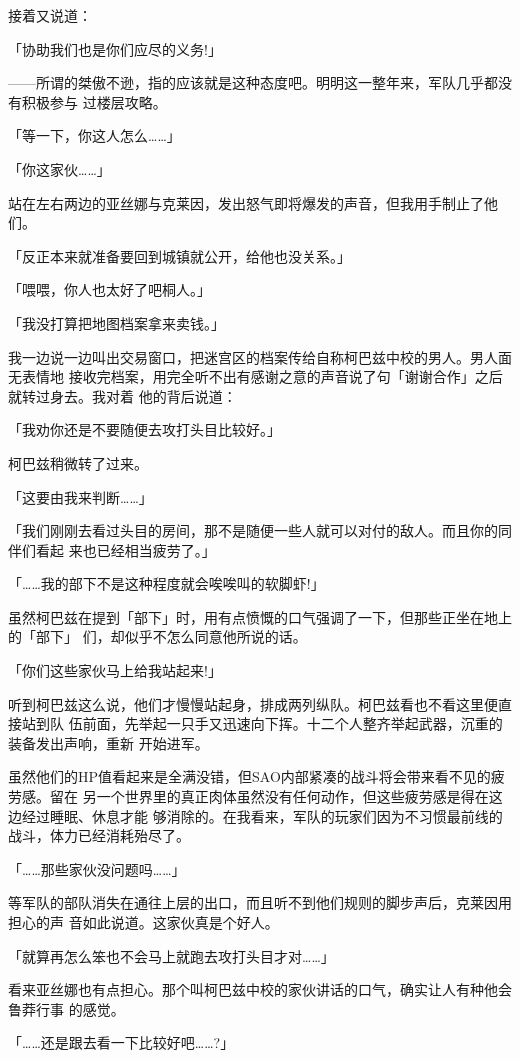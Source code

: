 \documentclass[11pt]{book}
\begin{document}
接着又说道：

「协助我们也是你们应尽的义务!」

——所谓的桀傲不逊，指的应该就是这种态度吧。明明这一整年来，军队几乎都没有积极参与
过楼层攻略。

「等一下，你这人怎么……」

「你这家伙……」

站在左右两边的亚丝娜与克莱因，发出怒气即将爆发的声音，但我用手制止了他们。

「反正本来就准备要回到城镇就公开，给他也没关系。」

「喂喂，你人也太好了吧桐人。」

「我没打算把地图档案拿来卖钱。」

我一边说一边叫出交易窗口，把迷宫区的档案传给自称柯巴兹中校的男人。男人面无表情地
接收完档案，用完全听不出有感谢之意的声音说了句「谢谢合作」之后就转过身去。我对着
他的背后说道：

「我劝你还是不要随便去攻打头目比较好。」

柯巴兹稍微转了过来。

「这要由我来判断……」

「我们刚刚去看过头目的房间，那不是随便一些人就可以对付的敌人。而且你的同伴们看起
来也已经相当疲劳了。」

「……我的部下不是这种程度就会唉唉叫的软脚虾!」

虽然柯巴兹在提到「部下」时，用有点愤慨的口气强调了一下，但那些正坐在地上的「部下」
们，却似乎不怎么同意他所说的话。

「你们这些家伙马上给我站起来!」

听到柯巴兹这么说，他们才慢慢站起身，排成两列纵队。柯巴兹看也不看这里便直接站到队
伍前面，先举起一只手又迅速向下挥。十二个人整齐举起武器，沉重的装备发出声响，重新
开始进军。

虽然他们的HP值看起来是全满没错，但SAO内部紧凑的战斗将会带来看不见的疲劳感。留在
另一个世界里的真正肉体虽然没有任何动作，但这些疲劳感是得在这边经过睡眠、休息才能
够消除的。在我看来，军队的玩家们因为不习惯最前线的战斗，体力已经消耗殆尽了。

「……那些家伙没问题吗……」

等军队的部队消失在通往上层的出口，而且听不到他们规则的脚步声后，克莱因用担心的声
音如此说道。这家伙真是个好人。

「就算再怎么笨也不会马上就跑去攻打头目才对……」

看来亚丝娜也有点担心。那个叫柯巴兹中校的家伙讲话的口气，确实让人有种他会鲁莽行事
的感觉。

「……还是跟去看一下比较好吧……?」
\end{document}
